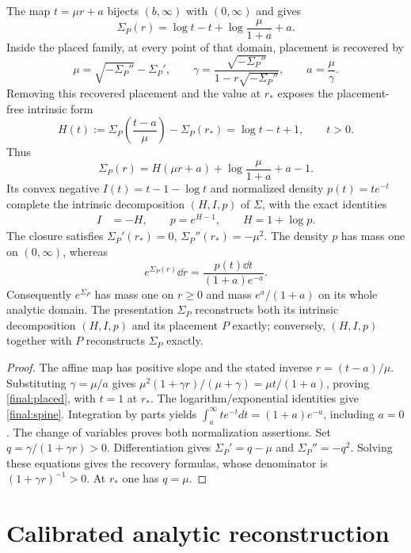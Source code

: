 \begin{theorem}
\label{final:C0-placement}
The map $t=\mu r+a$ bijects $(b,\infty)$ with $(0,\infty)$ and gives
\[
 \Sigma_P(r)=\log t-t+\log\frac\mu{1+a}+a.
\]
Inside the placed family, at every point of that domain, placement
is recovered by
\[
 \mu=\sqrt{-\Sigma_P''}-\Sigma_P',\qquad
 \gamma=\frac{\sqrt{-\Sigma_P''}}{1-r\sqrt{-\Sigma_P''}},
 \qquad a=\frac\mu\gamma.
\]
Removing this recovered placement and the value at $r_*$ exposes
the placement-free intrinsic form
\[
 H(t):=\Sigma_P\!\left(\frac{t-a}{\mu}\right)-\Sigma_P(r_*)
      =\log t-t+1,\qquad t>0.
\]
Thus
\begin{equation}
 \Sigma_P(r)=H(\mu r+a)+\log\frac\mu{1+a}+a-1.\label{final:placed}
\end{equation}
Its convex negative $I(t)=t-1-\log t$ and normalized density
$p(t)=te^{-t}$ complete the intrinsic decomposition $(H,I,p)$ of
$\Sigma$, with the exact identities
\begin{align}
 I&=-H,\qquad p=e^{H-1},\qquad H=1+\log p.\label{final:spine}
\end{align}
The closure satisfies $\Sigma_P'(r_*)=0$, $\Sigma_P''(r_*)=-\mu^2$.
The density $p$ has mass one on $(0,\infty)$, whereas
\[
 e^{\Sigma_P(r)}\dd r=\frac{p(t)\dd t}{(1+a)e^{-a}}.
\]
Consequently $e^{\Sigma_P}$ has mass one on $r\ge0$ and mass
$e^a/(1+a)$ on its whole analytic domain.
The presentation $\Sigma_P$ reconstructs both its intrinsic decomposition
$(H,I,p)$ and its placement $P$ exactly; conversely, $(H,I,p)$ together
with $P$ reconstructs $\Sigma_P$ exactly.
\end{theorem}
\begin{proof}
The affine map has positive slope and the stated inverse
$r=(t-a)/\mu$. Substituting $\gamma=\mu/a$ gives
$\mu^2(1+\gamma r)/(\mu+\gamma)=\mu t/(1+a)$, proving
\eqref{final:placed}, with $t=1$ at $r_*$. The logarithm/exponential identities give
\eqref{final:spine}. Integration by parts yields
$\int_a^\infty te^{-t}dt=(1+a)e^{-a}$, including $a=0$.
The change of variables proves both normalization assertions.
Set $q=\gamma/(1+\gamma r)>0$. Differentiation gives
$\Sigma_P'=q-\mu$ and $\Sigma_P''=-q^2$. Solving these equations
gives the recovery formulas, whose denominator is
$(1+\gamma r)^{-1}>0$. At $r_*$ one has $q=\mu$.
\end{proof}

\section{Calibrated analytic reconstruction}
\label{final:core}


